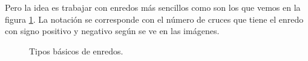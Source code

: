 \documentclass[14pt]{extarticle}
\begin{document}
Pero la idea es trabajar con enredos más sencillos como son los que vemos en la figura \ref{conw2}. La notación se corresponde con el número de cruces que tiene el enredo con signo positivo y negativo según se ve en las imágenes.\\
   \begin{figure}[h!]
   	\centering
   	
   	
   	\caption{Tipos básicos de enredos.}
   	\label{conw2} 
   \end{figure} 
\end{document}
